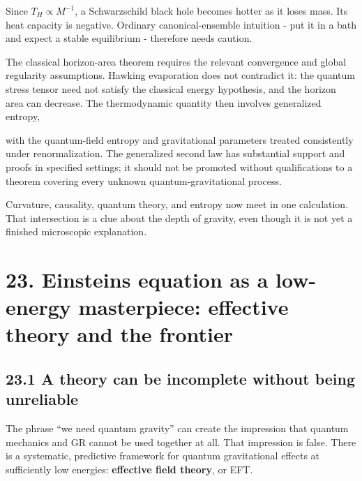 \documentclass[
  11pt,
  letterpaper,
  oneside,
  openany]{scrbook}
\begin{document}
Since \(T_H\propto M^{-1}\), a Schwarzschild black hole becomes hotter
as it loses mass. Its heat capacity is negative. Ordinary
canonical-ensemble intuition - put it in a bath and expect a stable
equilibrium - therefore needs caution.

The classical horizon-area theorem requires the relevant convergence and
global regularity assumptions. Hawking evaporation does not contradict
it: the quantum stress tensor need not satisfy the classical energy
hypothesis, and the horizon area can decrease. The thermodynamic
quantity then involves generalized entropy,

\begin{center}
\begingroup
{}
\ifdim\wd\grmathbox>\linewidth
\resizebox{\linewidth}{!}{\usebox{\grmathbox}}
\else\usebox{\grmathbox}\fi
\endgroup
\end{center}

with the quantum-field entropy and gravitational parameters treated
consistently under renormalization. The generalized second law has
substantial support and proofs in specified settings; it should not be
promoted without qualifications to a theorem covering every unknown
quantum-gravitational process.

Curvature, causality, quantum theory, and entropy now meet in one
calculation. That intersection is a clue about the depth of gravity,
even though it is not yet a finished microscopic explanation.

\hypertarget{chapter-23}{%
\chapter{23. Einstein\textquotesingle s equation as a low-energy
masterpiece: effective theory and the frontier}\label{chapter-23}}

\hypertarget{a-theory-can-be-incomplete-without-being-unreliable}{%
\section{23.1 A theory can be incomplete without being
unreliable}\label{a-theory-can-be-incomplete-without-being-unreliable}}

The phrase ``we need quantum gravity'' can create the impression that
quantum mechanics and GR cannot be used together at all. That impression
is false. There is a systematic, predictive framework for quantum
gravitational effects at sufficiently low energies: \textbf{effective
field theory}, or EFT.
\end{document}
